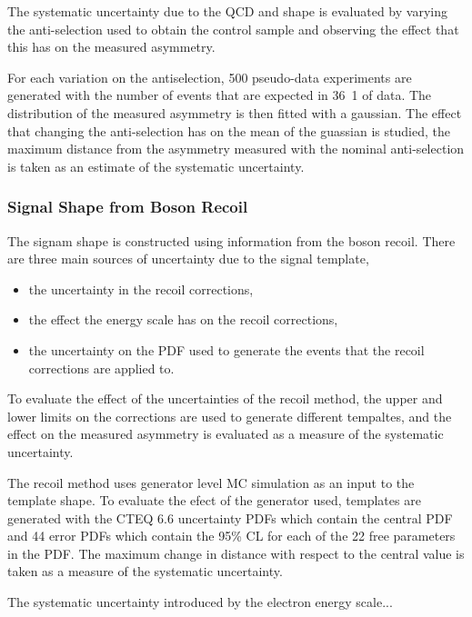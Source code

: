 The systematic uncertainty due to the \ac{QCD} and \gjet \ETm shape is evaluated by
varying the anti-selection used to obtain the control sample and observing the
effect that this has on the measured asymmetry.

For each variation on the antiselection, 500 pseudo-data experiments are
generated with the number of events that are expected in \unit{36.1}{\invpb} of
data. The distribution of the measured asymmetry is then fitted with a
gaussian.
The effect that changing the anti-selection has on the mean of the guassian is
studied, the maximum distance from the asymmetry measured with the nominal
anti-selection is taken as an estimate of the systematic uncertainty.

\subsubsection{Signal \ETm Shape from Boson Recoil}

The signam \ETm shape is constructed using information from the boson recoil.
There are three main sources of uncertainty due to the signal template,

\begin{itemize}
    \item the uncertainty in the recoil corrections,
    \item the effect the energy scale has on the recoil corrections,
    \item the uncertainty on the \ac{PDF} used to generate the events that the
recoil corrections are applied to.
\end{itemize}

To evaluate the effect of the uncertainties of the recoil method, the upper and
lower limits on the corrections are used to generate different tempaltes, and
the effect on the measured asymmetry is evaluated as a measure of the
systematic uncertainty.

The recoil method uses generator level \ac{MC} simulation as an input to the
template shape. To evaluate the efect of the generator used, templates are
generated with the CTEQ 6.6 %
uncertainty \acp{PDF} which contain the central \ac{PDF} and 44 error \acp{PDF}
which contain the \unit{95}{\%} \ac{CL} for each of the 22 free parameters in
the \ac{PDF}. The maximum change in distance with respect to the central value
is taken as a measure of the systematic uncertainty.

The systematic uncertainty introduced by the electron energy scale...

